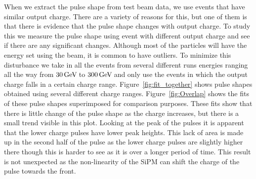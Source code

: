 When we extract the pulse shape from test beam data, we use events that have similar output charge. There are a variety of reasons for this, but one of them is that there is evidence that the pulse shape changes with output charge. To study this we measure the pulse shape using event with different output charge and see if there are any significant changes. Although most of the particles will have the energy set using the beam, it is common to have outliers. To minimize this disturbance we take in all the events from several different runs energies ranging all the way from $30 {\,\text{Ge\hspace{-.08em}V\hspace{-0.16em}}}$ to $300 {\,\text{Ge\hspace{-.08em}V\hspace{-0.16em}}}$ and only use the events in which the output charge falls in a certain charge range. Figure~\ref{fig:fit_together} shows pulse shapes obtained using several different charge ranges. Figure~\ref{fig:Overlap} shows the fits of these pulse shapes superimposed for comparison purposes. These fits show that there is little change of the pulse shape as the charge increases, but there is a small trend visible in this plot. Looking at the peak of the pulses it is apparent that the lower charge pulses have lower peak heights. This lack of area is made up in the second half of the pulse as the lower charge pulses are slightly higher there though this is harder to see as it is over a longer period of time. This result is not unexpected as the non-linearity of the SiPM can shift the charge of the pulse towards the front. 


